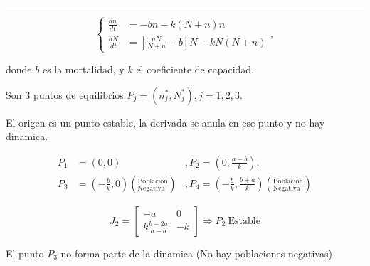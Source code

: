 \documentclass[twocolumn,aps,prl]{revtex4-1}
\newcommand{\nstar}{n^*}
\newcommand{\Nstar}{N^*}
\newcommand*\sepline{%
  \begin{center}
    \rule[1ex]{.5\textwidth}{.5pt}
  \end{center}}
\begin{document}
\sepline

\begin{equation}
    \left\lbrace
    \begin{aligned}
        \frac{d n}{d t}&=  -b n - k (N+n) n \\
        \frac{d N}{d t}&=\left[\frac{a N}{N+n}-b\right] N- k N(N+n)
    \end{aligned}
    \right. ,
\end{equation}

donde $b$ es la mortalidad, y $k$ el coeficiente de 
capacidad.


Son 3 puntos de equilibrios $P_j = (\nstar_{j},\Nstar_{j}), j= 1, 2, 3$.

El origen es un punto estable, la derivada se anula en ese punto y no hay dinamica.

$$
\begin{aligned}
    P_1 &= (0, 0) &, P_2 = \left( 0, \frac{a-b}{k} \right), \\ 
    P_3 &= \left(- \frac{b}{k}, 0 \right) \left(^\text{Población}_\text{Negativa} \right) &,  P_4 = \left(- \frac{b}{k}, \frac{b+a}{k} \right) \left(^\text{Población}_\text{Negativa} \right)
\end{aligned}
$$



$$
J_2 = 
\begin{bmatrix}
    -a & 0  \\
    k \frac{b - 2a}{ a - b } & -k 
\end{bmatrix}
\Rightarrow  P_2 \ \text{Estable}
$$

El punto $P_3$ no forma parte de la dinamica (No hay poblaciones negativas)

\end{document}
